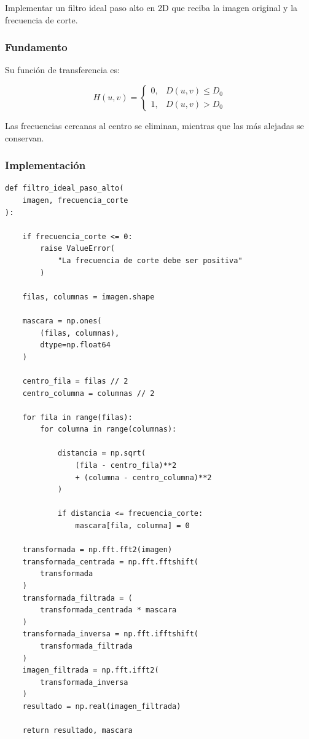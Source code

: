 \documentclass[11pt,letterpaper]{article}
\begin{document}
Implementar un filtro ideal paso alto
en 2D que reciba la imagen original
y la frecuencia de corte.

\subsubsection*{Fundamento}

Su función de transferencia es:

\begin{equation}
H(u,v)=
\begin{cases}
0, & D(u,v)\leq D_0\\
1, & D(u,v)>D_0
\end{cases}
\end{equation}

Las frecuencias cercanas al centro
se eliminan, mientras que las
más alejadas se conservan.

\subsubsection*{Implementación}

\begin{lstlisting}
def filtro_ideal_paso_alto(
    imagen, frecuencia_corte
):

    if frecuencia_corte <= 0:
        raise ValueError(
            "La frecuencia de corte debe ser positiva"
        )

    filas, columnas = imagen.shape

    mascara = np.ones(
        (filas, columnas),
        dtype=np.float64
    )

    centro_fila = filas // 2
    centro_columna = columnas // 2

    for fila in range(filas):
        for columna in range(columnas):

            distancia = np.sqrt(
                (fila - centro_fila)**2
                + (columna - centro_columna)**2
            )

            if distancia <= frecuencia_corte:
                mascara[fila, columna] = 0

    transformada = np.fft.fft2(imagen)
    transformada_centrada = np.fft.fftshift(
        transformada
    )
    transformada_filtrada = (
        transformada_centrada * mascara
    )
    transformada_inversa = np.fft.ifftshift(
        transformada_filtrada
    )
    imagen_filtrada = np.fft.ifft2(
        transformada_inversa
    )
    resultado = np.real(imagen_filtrada)

    return resultado, mascara
\end{lstlisting}
\end{document}
